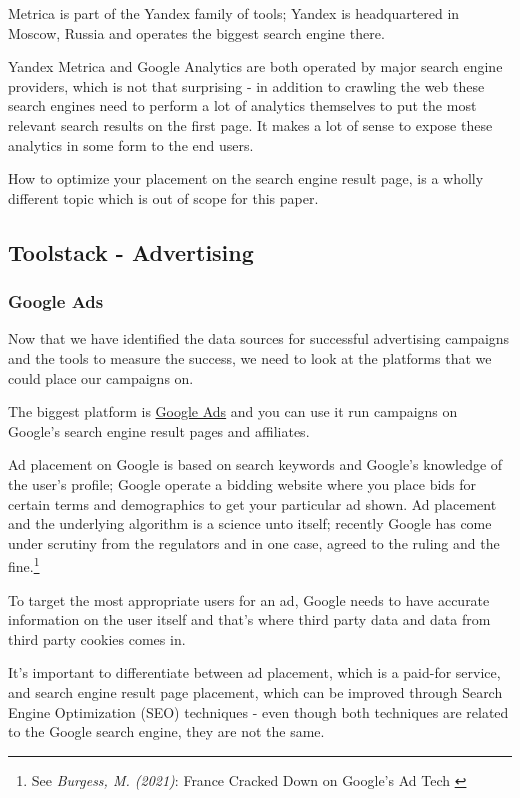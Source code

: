 Metrica is part of the Yandex family of tools; Yandex is headquartered in Moscow, Russia and operates the biggest search engine there.

Yandex Metrica and Google Analytics are both operated by major search engine providers, which is not that surprising - in addition to crawling the web these search engines need to perform a lot of analytics themselves to put the most relevant search results on the first page. It makes a lot of sense to expose these analytics in some form to the end users.

How to optimize your placement on the search engine result page, is a wholly different topic which is out of scope for this paper.

\subsection{Toolstack - Advertising}

\subsubsection{Google Ads}

Now that we have identified the data sources for successful advertising campaigns and the tools to measure the success, we need to look at the platforms that we could place our campaigns on. 

The biggest platform is \href{https://ads.google.com/home/}{Google Ads} and you can use it run campaigns on Google's search engine result pages and affiliates.

Ad placement on Google is based on search keywords and Google's knowledge of the user's profile; Google operate a bidding website where you place bids for certain terms and demographics to get your particular ad shown. Ad placement and the underlying algorithm is a science unto itself; recently Google has come under scrutiny from the regulators and in one case, agreed to the ruling and the fine.\footnote{See \textit{Burgess, M. (2021)}: France Cracked Down on Google’s Ad Tech \cite{googleAds}}

To target the most appropriate users for an ad, Google needs to have accurate information on the user itself and that's where third party data and data from third party cookies comes in.

It's important to differentiate between ad placement, which is a paid-for service, and search engine result page placement, which can be improved through Search Engine Optimization (SEO) techniques - even though both techniques are related to the Google search engine, they are not the same.

